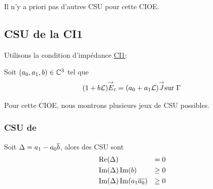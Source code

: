     Il n'y a priori pas d'autres CSU pour cette CIOE.

  \subsection{CSU de la CI1}

    Utilisons la condition d’impédance \hyperlink{ci1}{CI1}:

    Soit \((a_0, a_1,b) \in \mathbb C^3\) tel que
    \begin{align*}
      (1 + b \mathcal{L}) {\overset{\rightarrow}{E}}_t = (a_0 + a_1 \mathcal{L}) {\overset{\rightarrow}{J}} \text{sur } \Gamma
    \end{align*}

    Pour cette CIOE, nous montrons plusieurs jeux de CSU possibles.

    \subsubsection{CSU de \cite{stupfel_sufficient_2011}}

      \begin{prop}
        Soit \(\Delta = a_1 - a_0{\overline{b}}\), alors des CSU sont
        \begin{align}
          &\operatorname{Re}(\Delta) &= 0\\
          &\operatorname{Im}(\Delta)\operatorname{Im}(b) &\ge 0\\
          &\operatorname{Im}(\Delta)\operatorname{Im}(a_1{\overline{a_0}})&\ge 0
        \end{align}
      \end{prop}

